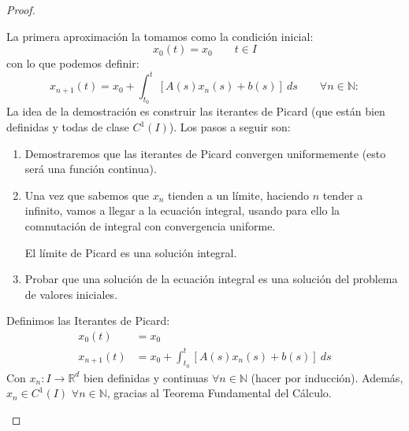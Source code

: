 \begin{teo}
\begin{proof}
\begin{itemize}
\begin{description}
                        La primera aproximación la tomamos como la condición inicial:
                            \begin{equation*}
                                x_0(t) = x_0 \qquad t\in I
                            \end{equation*}
                            con lo que podemos definir:
                            \begin{equation*}
                                x_{n+1}(t) = x_0 + \int_{t_0}^{t} [A(s)x_n(s) + b(s)]~ds \qquad \forall n\in \mathbb{N}
 :                           \end{equation*}
                        La idea de la demostración es construir las iterantes de Picard (que están bien definidas y todas de clase $C^1(I)$). Los pasos a seguir son:
                        \begin{enumerate}
                            \item Demostraremos que las iterantes de Picard convergen uniformemente (esto será una función continua).
                            \item Una vez que sabemos que $x_n$ tienden a un límite, haciendo $n$ tender a infinito, vamos a llegar a la ecuación integral, usando para ello la comnutación de integral con convergencia uniforme.

                                El límite de Picard es una solución integral.
                            \item Probar que una solución de la ecuación integral es una solución del problema de valores iniciales.
                        \end{enumerate}

                        Definimos las Iterantes de Picard:
                        \begin{align*}
                            x_0(t) &= x_0 \\
                            x_{n+1}(t) &= x_0 + \int_{t_0}^{t} [A(s)x_n(s)+b(s)]~ds 
                        \end{align*}
                        Con $x_n:I\rightarrow\mathbb{R}^d$ bien definidas y continuas $\forall n\in \mathbb{N}$ (hacer por inducción). Además, $x_n\in C^1(I)$ $\forall n\in \mathbb{N}$, gracias al Teorema Fundamental del Cálculo.\\


\end{description}
\end{itemize}
\end{proof}
\end{teo}
